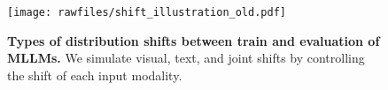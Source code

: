 \begin{figure}[h]
    \centering
    \texttt{[image: rawfiles/shift\_illustration\_old.pdf]}
    \vspace{-1.5em}
    \caption{\textbf{Types of distribution shifts between train and evaluation of MLLMs.} We simulate visual, text, and joint shifts by controlling the shift of each input modality.}
    \label{fig:shifts}
    \vspace{-0.3em}
\end{figure}